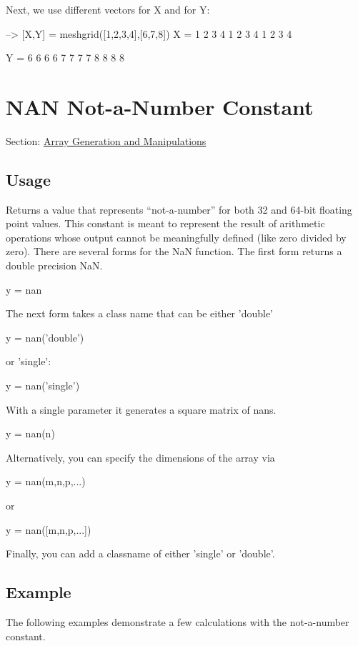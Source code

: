 Next, we use different vectors for {\ttfamily X} and for {\ttfamily Y}\-:


\begin{DoxyVerbInclude}
--> [X,Y] = meshgrid([1,2,3,4],[6,7,8])
X = 
 1 2 3 4 
 1 2 3 4 
 1 2 3 4 

Y = 
 6 6 6 6 
 7 7 7 7 
 8 8 8 8 
\end{DoxyVerbInclude}
 \hypertarget{array_nan}{}\section{N\-A\-N Not-\/a-\/\-Number Constant}\label{array_nan}
Section\-: \hyperlink{sec_array}{Array Generation and Manipulations} \hypertarget{vtkwidgets_vtkxyplotwidget_Usage}{}\subsection{Usage}\label{vtkwidgets_vtkxyplotwidget_Usage}
Returns a value that represents ``not-\/a-\/number'' for both 32 and 64-\/bit floating point values. This constant is meant to represent the result of arithmetic operations whose output cannot be meaningfully defined (like zero divided by zero). There are several forms for the {\ttfamily Na\-N} function. The first form returns a double precision {\ttfamily Na\-N}. \begin{DoxyVerb}   y = nan
\end{DoxyVerb}
 The next form takes a class name that can be either {\ttfamily 'double'} \begin{DoxyVerb}   y = nan('double')
\end{DoxyVerb}
 or {\ttfamily 'single'}\-: \begin{DoxyVerb}   y = nan('single')
\end{DoxyVerb}
 With a single parameter it generates a square matrix of {\ttfamily nan}s. \begin{DoxyVerb}   y = nan(n)
\end{DoxyVerb}
 Alternatively, you can specify the dimensions of the array via \begin{DoxyVerb}   y = nan(m,n,p,...)
\end{DoxyVerb}
 or \begin{DoxyVerb}   y = nan([m,n,p,...])
\end{DoxyVerb}
 Finally, you can add a classname of either {\ttfamily 'single'} or {\ttfamily 'double'}. \hypertarget{variables_struct_Example}{}\subsection{Example}\label{variables_struct_Example}
The following examples demonstrate a few calculations with the not-\/a-\/number constant.


